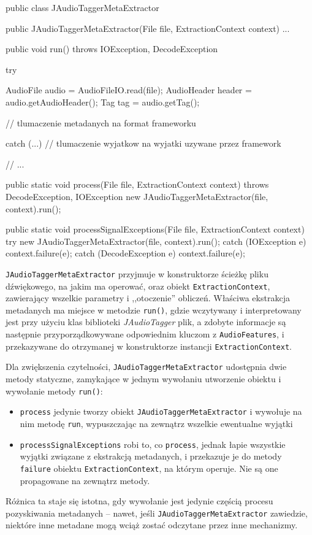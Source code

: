 \begin{java}
public class JAudioTaggerMetaExtractor {

    public JAudioTaggerMetaExtractor(File file, ExtractionContext context) { ... }

    public void run() throws IOException, DecodeException {
        try {
            AudioFile audio = AudioFileIO.read(file);
            AudioHeader header = audio.getAudioHeader();
            Tag tag = audio.getTag();

            // tlumaczenie metadanych na format frameworku
        } catch (...) {
            // tlumaczenie wyjatkow na wyjatki uzywane przez framework
        }
    }

    // ...

    public static void process(File file, ExtractionContext context) throws DecodeException, 
            IOException {
        new JAudioTaggerMetaExtractor(file, context).run();
    }

    public static void processSignalExceptions(File file, ExtractionContext context) {
        try {
            new JAudioTaggerMetaExtractor(file, context).run();
        } catch (IOException e) {
            context.failure(e);
        } catch (DecodeException e) {
            context.failure(e);
        }
    }
}
\end{java}


\texttt{JAudioTaggerMetaExtractor} przyjmuje w konstruktorze ścieżkę pliku dźwiękowego, na jakim ma
operować, oraz obiekt \texttt{ExtractionContext}, zawierający wszelkie parametry i ,,otoczenie''
obliczeń. Właściwa ekstrakcja metadanych ma miejsce w metodzie \texttt{run()}, gdzie wczytywany i
interpretowany jest przy użyciu klas biblioteki \emph{JAudioTagger} plik, a zdobyte informacje są
następnie przyporządkowywane odpowiednim kluczom z \texttt{AudioFeatures}, i przekazywane do
otrzymanej w konstruktorze instancji \texttt{ExtractionContext}.

Dla zwiększenia czytelności, \texttt{JAudioTaggerMetaExtractor} udostępnia dwie metody statyczne,
zamykające w jednym wywołaniu utworzenie obiektu i wywołanie metody \texttt{run()}:

\begin{itemize}

  \item \texttt{process} jedynie tworzy obiekt \texttt{JAudioTaggerMetaExtractor} i wywołuje na nim
metodę \texttt{run}, wypuszczając na zewnątrz wszelkie ewentualne wyjątki

  \item \texttt{processSignalExceptions} robi to, co \texttt{process}, jednak łapie wszystkie
wyjątki związane z ekstrakcją metadanych, i przekazuje je do metody \texttt{failure} obiektu
\texttt{ExtractionContext}, na którym operuje. Nie są one propagowane na zewnątrz metody.

\end{itemize}

Różnica ta staje się istotna, gdy wywołanie jest jedynie częścią procesu pozyskiwania metadanych --
nawet, jeśli \texttt{JAudioTaggerMetaExtractor} zawiedzie, niektóre inne metadane mogą wciąż zostać
odczytane przez inne mechanizmy. 

